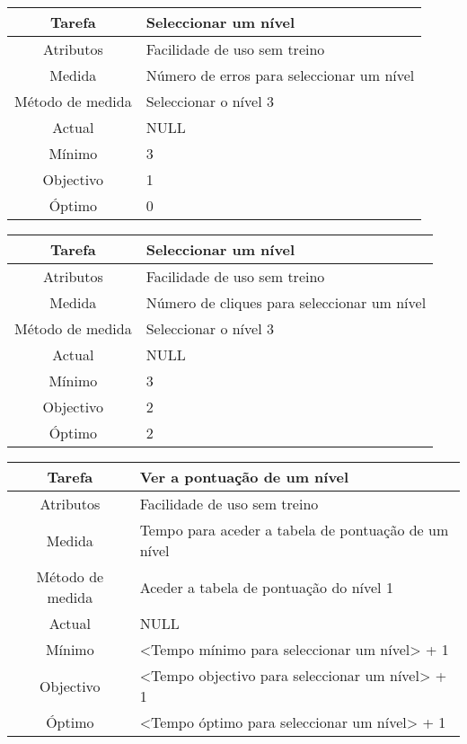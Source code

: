\begin{center}
	\begin{tabular} {|c|p{10cm}|}
		\hline
		Tarefa & Seleccionar um nível \\
		\hline
		Atributos & Facilidade de uso sem treino \\
		\hline
		Medida & Número de erros para seleccionar um nível \\
		\hline
		Método de medida & Seleccionar o nível 3 \\
		\hline
		Actual & NULL \\
		Mínimo & 3 \\
		Objectivo & 1 \\
		Óptimo & 0 \\
		\hline
	\end{tabular}
\end{center}

\begin{center}
	\begin{tabular} {|c|p{10cm}|}
		\hline
		Tarefa & Seleccionar um nível \\
		\hline
		Atributos & Facilidade de uso sem treino \\
		\hline
		Medida & Número de cliques para seleccionar um nível \\
		\hline
		Método de medida & Seleccionar o nível 3 \\
		\hline
		Actual & NULL \\
		Mínimo & 3 \\
		Objectivo & 2 \\
		Óptimo & 2 \\
		\hline
	\end{tabular}
\end{center}

\begin{center}
	\begin{tabular} {|c|p{10cm}|}
		\hline
		Tarefa & Ver a pontuação de um nível \\
		\hline
		Atributos & Facilidade de uso sem treino \\
		\hline
		Medida & Tempo para aceder a tabela de pontuação de um nível \\
		\hline
		Método de medida & Aceder a tabela de pontuação do nível 1 \\
		\hline
		Actual & NULL \\
		Mínimo & <Tempo mínimo para seleccionar um nível> + 1 \\
		Objectivo & <Tempo objectivo para seleccionar um nível> + 1 \\
		Óptimo & <Tempo óptimo para seleccionar um nível> + 1 \\
		\hline
	\end{tabular}
\end{center}

